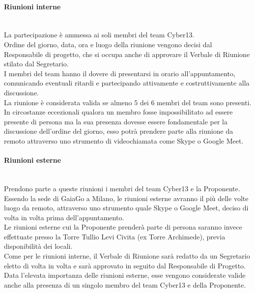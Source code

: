     \paragraph{Riunioni interne}
    ~\\La partecipazione è ammessa ai soli membri del team Cyber13.
    \\Ordine del giorno, data, ora e luogo della riunione vengono decisi dal Responsabile di progetto, che si occupa anche di approvare il Verbale di Riunione stilato dal Segretario.
    \\I membri del team hanno il dovere di presentarsi in orario all'appuntamento, comunicando eventuali ritardi e partecipando attivamente e costruttivamente alla discussione.
    \\La riunione è considerata valida se almeno 5 dei 6 membri del team sono presenti. In circostanze eccezionali qualora un membro fosse impossibilitato ad essere presente di persona  ma la sua presenza dovesse essere fondamentale per la discussione dell'ordine del giorno, esso potrà prendere parte alla riunione da remoto attraverso uno strumento di videochiamata come Skype o Google Meet.
    
    \paragraph{Riunioni esterne}
    ~\\Prendono parte a queste riunioni i membri del team Cyber13 e la Proponente.
    \\Essendo la sede di GaiaGo a Milano, le riunioni esterne avranno il più delle volte luogo da remoto, attraverso uno strumento quale Skype o Google Meet, deciso di volta in volta prima dell'appuntamento.
    \\Le riunioni esterne cui la Proponente prenderà parte di persona saranno invece effettuate presso la Torre Tullio Levi Civita (ex Torre Archimede), previa disponibilità dei locali.
    \\Come per le riunioni interne, il Verbale di Riunione sarà redatto da un Segretario eletto di volta in volta e sarà approvato in seguito dal Responsabile di Progetto.
    \\Data l'elevata importanza delle riunioni esterne, esse vengono considerate valide anche alla presenza di un singolo membro del team Cyber13 e della Proponente.
    
